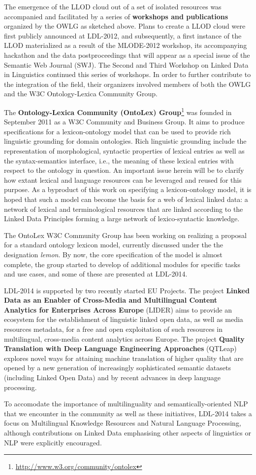 The emergence of the LLOD cloud out of a set of isolated resources was accompanied and facilitated by a series of \textbf{workshops and publications} organized by the OWLG as sketched above. 
Plans to create a LLOD cloud were first publicly announced at LDL-2012, and subsequently, a first instance of the LLOD materialized as a result of the MLODE-2012 workshop, its accompanying hackathon and the data postproceedings that will appear as a special issue of the Semantic Web Journal (SWJ). 
The Second and Third Workshop on Linked Data in Linguistics continued this series of workshops.
In order to further contribute to the integration of the field, their organizers involved members of both the OWLG and the W3C Ontology-Lexica Community Group.

The \textbf{Ontology-Lexica Community (OntoLex) Group}\footnote{\url{http://www.w3.org/community/ontolex}} was founded  in September 2011 as a W3C Community and Business Group. It aims to produce specifications for a lexicon-ontology model that can be used to provide rich linguistic grounding for domain ontologies.
Rich linguistic grounding include the representation of morphological, syntactic properties of lexical entries as well as the syntax-semantics interface, i.e., the meaning of these lexical entries with respect to the ontology in question. An important issue herein will be to clarify how extant lexical and language resources can be leveraged and reused for this purpose. As a byproduct of this work on specifying a lexicon-ontology model, it is hoped that such a model can become the basis for a web of lexical linked data: a network of lexical and terminological resources that are linked according to the Linked Data Principles forming a large network of lexico-syntactic knowledge.

The OntoLex W3C Community Group has been working on realizing a proposal for a standard ontology lexicon model, currently discussed under the the designation \emph{lemon}. By now, the core specification of the model is almost complete, the group started to develop of additional modules for specific tasks and use cases, and some of these are presented at LDL-2014.

LDL-2014 is supported by two recently started EU Projects.
The project \textbf{Linked Data as an Enabler of Cross-Media and Multilingual Content Analytics for Enterprises Across Europe} (LIDER) aims to provide an 
ecosystem for the establishment of linguistic linked open data, as well as media resources metadata, for a free and open exploitation of such resources in 
multilingual, cross-media content analytics across Europe. 
The project \textbf{Quality Translation with Deep Language Engineering Approaches} (QTLeap) explores novel ways for attaining machine translation of higher quality that are opened by a new generation of increasingly sophisticated semantic datasets (including Linked Open Data) and by recent advances in deep language processing.

To accomodate the importance of multilinguality and semantically-oriented NLP that we encounter in the community as well as these initiatives, LDL-2014 takes a focus on Multilingual Knowledge Resources and Natural Language Processing, although contributions on Linked Data emphasising other aspects of linguistics or NLP were explicitly encouraged.